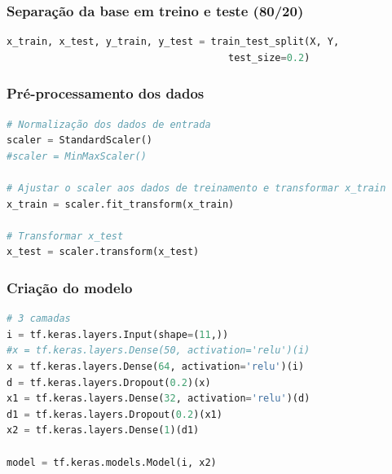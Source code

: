 \subsubsection*{Separação da base em treino e teste (80/20)}
\begin{lstlisting}[language=Python, style=input]
x_train, x_test, y_train, y_test = train_test_split(X, Y,
                                      test_size=0.2)
\end{lstlisting}
\subsubsection*{Pré-processamento dos dados}
\begin{lstlisting}[language=Python, style=input]
# Normalização dos dados de entrada
scaler = StandardScaler()
#scaler = MinMaxScaler()

# Ajustar o scaler aos dados de treinamento e transformar x_train
x_train = scaler.fit_transform(x_train)

# Transformar x_test
x_test = scaler.transform(x_test)
\end{lstlisting}
\subsubsection*{Criação do modelo}
\begin{lstlisting}[language=Python, style=input]
# 3 camadas
i = tf.keras.layers.Input(shape=(11,))
#x = tf.keras.layers.Dense(50, activation='relu')(i)
x = tf.keras.layers.Dense(64, activation='relu')(i)
d = tf.keras.layers.Dropout(0.2)(x)
x1 = tf.keras.layers.Dense(32, activation='relu')(d)
d1 = tf.keras.layers.Dropout(0.2)(x1)
x2 = tf.keras.layers.Dense(1)(d1)

model = tf.keras.models.Model(i, x2)
\end{lstlisting}
